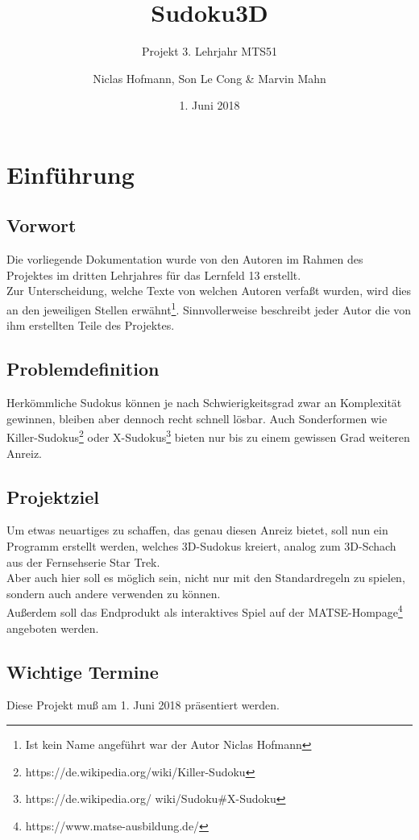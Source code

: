 \documentclass[a4paper,12pt]{scrreprt}
\title{Sudoku3D}
\subtitle{Projekt 3. Lehrjahr MTS51}
\author{Niclas Hofmann, Son Le Cong \& Marvin Mahn}
\date{1. Juni 2018}
\begin{document}
	\maketitle
	\tableofcontents

	\chapter{Einf\"uhrung}
	\section{Vorwort}
	Die vorliegende Dokumentation wurde von den Autoren im Rahmen des Projektes im dritten Lehrjahres
	f\"ur das Lernfeld 13 erstellt.\medskip \\
	Zur Unterscheidung, welche Texte von welchen Autoren verfa{\ss}t wurden, wird dies an den jeweiligen
	Stellen erw\"ahnt\footnote{Ist kein Name angef\"uhrt war der Autor Niclas Hofmann}.
	Sinnvollerweise beschreibt jeder Autor die von ihm erstellten Teile des Projektes.

	\section{Problemdefinition}
	Herk\"ommliche Sudokus k\"onnen je nach Schwierigkeitsgrad zwar an Komplexit\"at gewinnen,
	bleiben aber dennoch recht schnell l\"osbar. Auch Sonderformen wie Killer-Sudokus\footnote{
	https://de.wikipedia.org/wiki/Killer-Sudoku} oder X-Sudokus\footnote{https://de.wikipedia.org/
	wiki/Sudoku\#X-Sudoku} bieten nur bis zu einem gewissen Grad weiteren Anreiz.

	\section{Projektziel}
	Um etwas neuartiges zu schaffen, das genau diesen Anreiz bietet, soll nun ein Programm erstellt
	werden, welches 3D-Sudokus kreiert, analog zum 3D-Schach aus der Fernsehserie Star Trek.
	\medskip \\
	Aber auch hier soll es m\"oglich sein, nicht nur mit den Standardregeln zu spielen, sondern auch
	andere verwenden zu k\"onnen.\medskip \\
	Au{\ss}erdem soll das Endprodukt als interaktives Spiel auf der MATSE-Hompage\footnote{
	https://www.matse-ausbildung.de/} angeboten werden.

	\section{Wichtige Termine}
	Diese Projekt mu{\ss} am 1. Juni 2018 pr\"asentiert werden.
\end{document}
